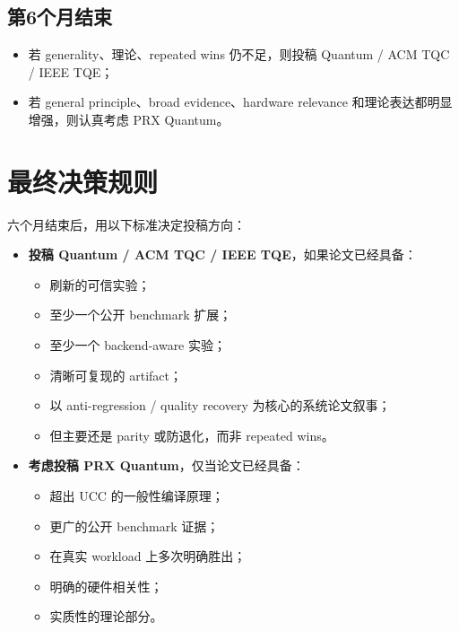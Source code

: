 \documentclass[11pt]{article}
\begin{document}
\subsection*{第6个月结束}
\begin{itemize}
    \item 若 generality、理论、repeated wins 仍不足，则投稿 Quantum / ACM TQC / IEEE TQE；
    \item 若 general principle、broad evidence、hardware relevance 和理论表达都明显增强，则认真考虑 PRX Quantum。
\end{itemize}

\section{最终决策规则}

六个月结束后，用以下标准决定投稿方向：

\begin{itemize}
    \item \textbf{投稿 Quantum / ACM TQC / IEEE TQE}，如果论文已经具备：
    \begin{itemize}
        \item 刷新的可信实验；
        \item 至少一个公开 benchmark 扩展；
        \item 至少一个 backend-aware 实验；
        \item 清晰可复现的 artifact；
        \item 以 anti-regression / quality recovery 为核心的系统论文叙事；
        \item 但主要还是 parity 或防退化，而非 repeated wins。
    \end{itemize}

    \item \textbf{考虑投稿 PRX Quantum}，仅当论文已经具备：
    \begin{itemize}
        \item 超出 UCC 的一般性编译原理；
        \item 更广的公开 benchmark 证据；
        \item 在真实 workload 上多次明确胜出；
        \item 明确的硬件相关性；
        \item 实质性的理论部分。
    \end{itemize}
\end{itemize}
\end{document}
